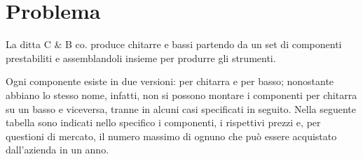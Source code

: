 \newpage
\section{Problema}
La ditta C \& B co. produce chitarre e bassi partendo da un set di componenti prestabiliti e assemblandoli insieme per produrre gli strumenti.

Ogni componente esiste in due versioni: per chitarra e per basso; nonostante abbiano lo stesso nome, infatti, non si possono montare i componenti per chitarra su un basso e viceversa, tranne in alcuni casi specificati in seguito. Nella seguente tabella sono indicati nello specifico i componenti, i rispettivi prezzi e, per questioni di mercato, il numero massimo di ognuno che può essere acquistato dall'azienda in un anno.

\begin{table}[htbp]
\end{table}
